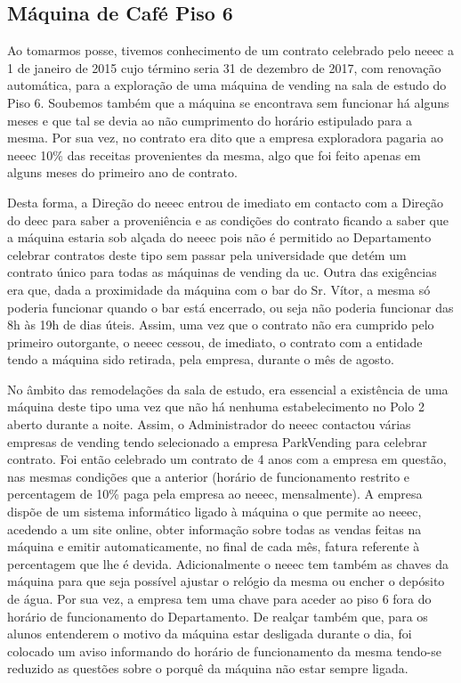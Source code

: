 
\subsection{Máquina de Café Piso 6}

Ao tomarmos posse, tivemos conhecimento de um contrato celebrado pelo \acrshort{neeec} a 1 de janeiro de 2015 cujo término seria  31 de dezembro de 2017, com renovação automática, para a exploração de uma máquina de vending na sala de estudo do Piso 6. Soubemos também que a máquina se encontrava sem funcionar há alguns meses e que tal se devia ao não cumprimento do horário estipulado para a mesma. Por sua vez, no contrato era dito que a empresa exploradora pagaria ao \acrshort{neeec} 10\% das receitas provenientes da mesma, algo que foi feito apenas em alguns meses do primeiro ano de contrato.

Desta forma, a Direção do \acrshort{neeec} entrou de imediato em contacto com a Direção do \acrshort{deec} para saber a proveniência e as condições do contrato ficando a saber que a máquina estaria sob alçada do \acrshort{neeec} pois não é permitido ao Departamento celebrar contratos deste tipo sem passar pela universidade que detém um contrato único para todas as máquinas de vending da \acrshort{uc}. Outra das exigências era que, dada a proximidade da máquina com o bar do Sr. Vítor, a mesma só poderia funcionar quando o bar está encerrado, ou seja não poderia funcionar das 8h às 19h de dias úteis. Assim, uma vez que o contrato não era cumprido pelo primeiro outorgante, o \acrshort{neeec} cessou, de imediato, o contrato com a entidade tendo a máquina sido retirada, pela empresa, durante o mês de agosto.

No âmbito das remodelações da sala de estudo, era essencial a existência de uma máquina deste tipo uma vez que não há nenhuma estabelecimento no Polo 2 aberto durante a noite. Assim, o Administrador do \acrshort{neeec} contactou várias empresas de vending tendo selecionado a empresa ParkVending para celebrar contrato. Foi então celebrado um contrato de 4 anos com a empresa em questão, nas mesmas condições que a anterior (horário de funcionamento restrito e percentagem de 10\% paga pela empresa ao \acrshort{neeec}, mensalmente). A empresa dispõe de um sistema informático ligado à máquina o que permite ao \acrshort{neeec}, acedendo a um site online, obter informação sobre todas as vendas feitas na máquina e emitir automaticamente, no final de cada mês, fatura referente à percentagem que lhe é devida. Adicionalmente o \acrshort{neeec} tem também as chaves da máquina para que seja possível ajustar o relógio da mesma ou encher o depósito de água. Por sua vez, a empresa tem uma chave para aceder ao piso 6 fora do horário de funcionamento do Departamento. De realçar também que, para os alunos entenderem o motivo da máquina estar desligada durante o dia, foi colocado um aviso informando do horário de funcionamento da mesma tendo-se reduzido as questões sobre o porquê da máquina não estar sempre ligada.
